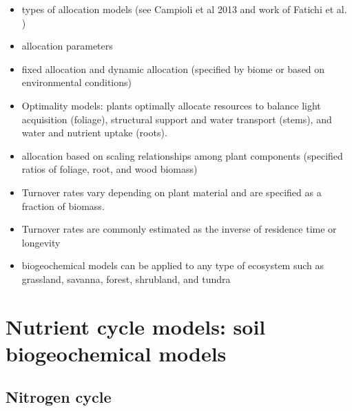 \documentclass[12pt,oneside]{book}
\begin{document}
\begin{itemize}
\item
  types of allocation models (see Campioli et al 2013 and work of
  Fatichi et al. )
\item
  allocation parameters
\item
  fixed allocation and dynamic allocation (specified by biome or based
  on environmental conditions)
\item
  Optimality models: plants optimally allocate resources to balance
  light acquisition (foliage), structural support and water transport
  (stems), and water and nutrient uptake (roots).
\item
  allocation based on scaling relationships among plant components
  (specified ratios of foliage, root, and wood biomass)
\item
  Turnover rates vary depending on plant material and are specified as a
  fraction of biomass.
\item
  Turnover rates are commonly estimated as the inverse of residence time
  or longevity
\item
  biogeochemical models can be applied to any type of ecosystem such as
  grassland, savanna, forest, shrubland, and tundra
\end{itemize}

\section{Nutrient cycle models: soil biogeochemical
models}\label{nutrient-cycle-models-soil-biogeochemical-models}

\subsection{Nitrogen cycle}\label{nitrogen-cycle}
\end{document}
